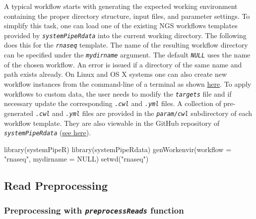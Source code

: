 \documentclass[14pt,]{article}
\newcommand{\hlnum}[1]{\textcolor[rgb]{0.816,0.125,0.439}{#1}}%
\newcommand{\hlstr}[1]{\textcolor[rgb]{0.251,0.627,0.251}{#1}}%
\newcommand{\hlstd}[1]{\textcolor[rgb]{0.251,0.251,0.251}{#1}}%
\newenvironment{Shaded}{\begin{myshaded}}{\end{myshaded}}
\newcommand{\ConstantTok}[1]{\hlnum{#1}}
\newcommand{\StringTok}[1]{\hlstr{#1}}
\newcommand{\FunctionTok}[1]{\hlstd{#1}}
\newcommand{\AttributeTok}[1]{{#1}}
\newcommand{\NormalTok}[1]{\hlstd{#1}}
\begin{document}
A typical workflow starts with generating the expected working environment
containing the proper directory structure, input files, and parameter settings.
To simplify this task, one can load one of the existing NGS workflows templates
provided by \emph{\texttt{systemPipeRdata}} into the current working directory. The
following does this for the \emph{\texttt{rnaseq}} template. The name of the resulting
workflow directory can be specified under the \emph{\texttt{mydirname}} argument. The
default \emph{\texttt{NULL}} uses the name of the chosen workflow. An error is issued if a
directory of the same name and path exists already. On Linux and OS X systems
one can also create new workflow instances from the command-line of a terminal as shown
\href{http://bioconductor.org/packages/devel/data/experiment/vignettes/systemPipeRdata/inst/doc/systemPipeRdata.html\#generate-workflow-template}{here}.
To apply workflows to custom data, the user needs to modify the \emph{\texttt{targets}} file and if
necessary update the corresponding \emph{\texttt{.cwl}} and \emph{\texttt{.yml}} files. A collection of pre-generated \emph{\texttt{.cwl}} and \emph{\texttt{.yml}} files are provided in the \emph{\texttt{param/cwl}} subdirectory of each workflow template. They
are also viewable in the GitHub repository of \emph{\texttt{systemPipeRdata}} (\href{https://github.com/tgirke/systemPipeRdata/tree/master/inst/extdata/param}{see
here}).

\begin{Shaded}
\begin{Highlighting}[]
\FunctionTok{library}\NormalTok{(systemPipeR)}
\FunctionTok{library}\NormalTok{(systemPipeRdata)}
\FunctionTok{genWorkenvir}\NormalTok{(}\AttributeTok{workflow =} \StringTok{"rnaseq"}\NormalTok{, }\AttributeTok{mydirname =} \ConstantTok{NULL}\NormalTok{)}
\FunctionTok{setwd}\NormalTok{(}\StringTok{"rnaseq"}\NormalTok{)}
\end{Highlighting}
\end{Shaded}

\hypertarget{read-preprocessing}{%
\subsection{Read Preprocessing}\label{read-preprocessing}}

\hypertarget{preprocessing-with-preprocessreads-function}{%
\subsubsection{\texorpdfstring{Preprocessing with \emph{\texttt{preprocessReads}} function}{Preprocessing with preprocessReads function}}\label{preprocessing-with-preprocessreads-function}}
\end{document}
